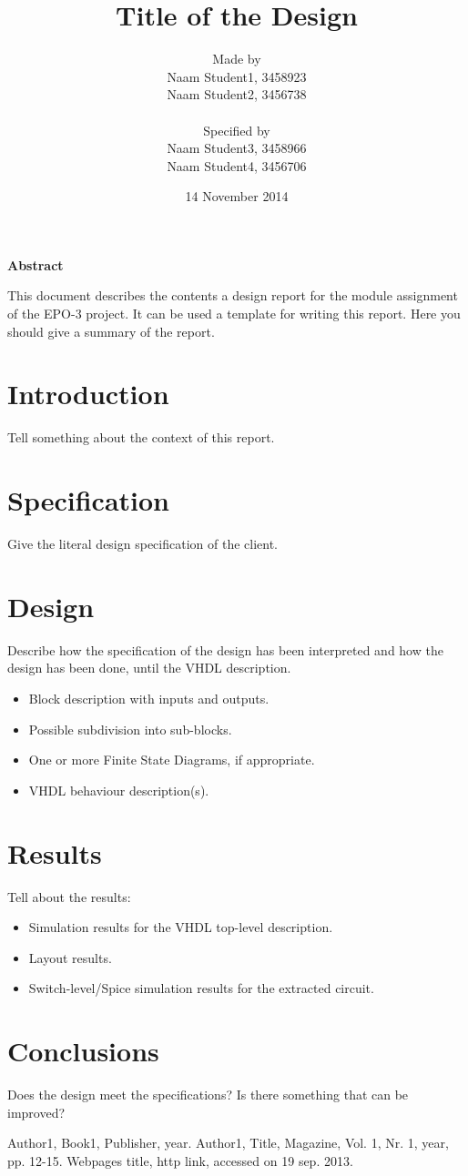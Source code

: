 \documentclass[11pt,twoside,a4paper]{article}
\title{Title of the Design}
\author{
Made by\\
Naam Student1, 3458923\\
Naam Student2, 3456738\\
\\
Specified by\\
Naam Student3, 3458966\\
Naam Student4, 3456706\\
}
\date{14 November 2014}
\begin{document}
\maketitle
\thispagestyle{empty}
\vspace{30 mm}
\begin{center}
\Large \bf 
Abstract
\end{center}
This document describes the contents a design report for the module assignment of the EPO-3 project. 
It can be used a template for writing this report. 
Here you should give a summary of the report.
\clearpage

\tableofcontents
\clearpage

\section{Introduction}
Tell something about the context of this report.

\section{Specification}
Give the literal design specification of the client.

\section{Design}
Describe how the specification of the design has been interpreted and how the design 
has been done, until the VHDL description.
\begin{itemize}
\item
Block description with inputs and outputs.
\item
Possible subdivision into sub-blocks.
\item
One or more Finite State Diagrams, if appropriate.
\item
VHDL behaviour description(s).
\end{itemize}

\section{Results}
Tell about the results:
\begin{itemize}
\item
Simulation results for the VHDL top-level description.
\item
Layout results.
\item
Switch-level/Spice simulation results for the extracted circuit.
\end{itemize}

\section{Conclusions}
Does the design meet the specifications?
Is there something that can be improved?

\begin{thebibliography}{9}
Author1, 
Book1, 
Publisher, 
year.
Author1, 
Title, 
Magazine, 
Vol. 1, 
Nr. 1, 
year, 
pp. 12-15.
Webpages title, 
http link, 
accessed on 19 sep. 2013.
\end{thebibliography}
\end{document}

